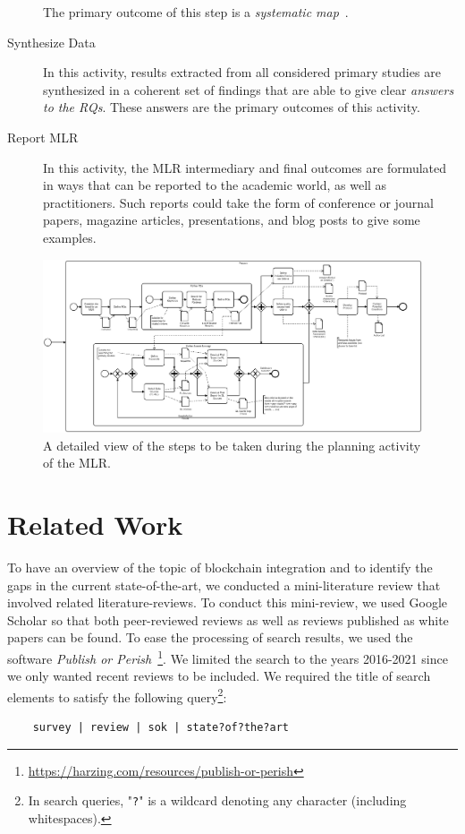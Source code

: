 \documentclass[review]{elsarticle}
\begin{document}
\begin{description}
	The primary outcome of this step is a \emph{systematic map}~\cite{Kitchenham2007SLR}.
	\item[Synthesize Data] In this activity, results extracted from all considered primary studies are synthesized in a coherent set of findings that are able to give clear \emph{answers to the RQs}.
	These answers are the primary outcomes of this activity.
	\item[Report MLR] In this activity, the MLR intermediary and final outcomes are formulated in ways that can be reported to the academic world, as well as practitioners.
	Such reports could take the form of conference or journal papers, magazine articles, presentations, and blog posts to give some examples.
\end{description}


\begin{figure}
	\includegraphics[width=\linewidth]{graphics/planning-detailed}
	\caption[Planning overview]{A detailed view of the steps to be taken during the planning activity of the MLR.}
	\label{fig:prepare-detailed}
\end{figure}

\section{Related Work}
\label{sec:related-work}

To have an overview of the topic of blockchain integration and to identify the gaps in the current state-of-the-art, we conducted a mini-literature review that involved related literature-reviews.
To conduct this mini-review, we used Google Scholar so that both peer-reviewed reviews as well as reviews published as white papers can be found.
To ease the processing of search results, we used the software \textit{Publish or Perish}~\footnote{\url{https://harzing.com/resources/publish-or-perish}}.
We limited the search to the years 2016-2021 since we only wanted recent reviews to be included.
We required the title of search elements to satisfy the following query\footnote{In search queries, "\texttt{?}" is a wildcard denoting any character (including whitespaces).}:
\begin{lstlisting}
	survey | review | sok | state?of?the?art
\end{lstlisting}
\end{document}
